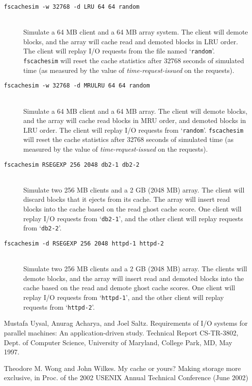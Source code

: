 \documentclass[twoside]{article}
\newcommand{\fscachesim}{\texttt{fscachesim}}
\begin{document}
\begin{description}

\item[\texttt{\fscachesim{} -w 32768 -d LRU 64 64 random}] \quad\\ Simulate a
64 MB client and a 64 MB array system. The client will demote blocks, and
the array will cache read and demoted blocks in LRU order. The client will
replay I/O requests from the file named `\texttt{random}'. \fscachesim{}
will reset the cache statistics after 32768 seconds of simulated time (as
measured by the value of \textit{time-request-issued} on the requests).

\item[\texttt{\fscachesim{} -w 32768 -d MRULRU 64 64 random}] \quad\\
Simulate a 64 MB client and a 64 MB array. The client will demote blocks,
and the array will cache read blocks in MRU order, and demoted blocks in
LRU order. The client will replay I/O requests from
`\texttt{random}'. \fscachesim{} will reset the cache statistics after
32768 seconds of simulated time (as measured by the value of
\textit{time-request-issued} on the requests).

\item[\texttt{\fscachesim{} RSEGEXP 256 2048 db2-1 db2-2}] \quad\\ Simulate
two 256 MB clients and a 2 GB (2048 MB) array. The client will discard
blocks that it ejects from its cache. The array will insert read blocks
into the cache based on the read ghost cache score. One client will replay
I/O requests from `\texttt{db2-1}', and the other client will replay
requests from `\texttt{db2-2}'.

\item[\texttt{\fscachesim{} -d RSEGEXP 256 2048 httpd-1 httpd-2}] \quad\\
Simulate two 256 MB clients and a 2 GB (2048 MB) array. The clients will
demote blocks, and the array will insert read and demoted blocks into the
cache based on the read and demote ghost cache scores. One client will
replay I/O requests from `\texttt{httpd-1}', and the other client will
replay requests from `\texttt{httpd-2}'.

\end{description}

\begin{thebibliography}{UAS97}

Mustafa Uysal, Anurag Acharya, and Joel Saltz.
\newblock Requirements of {I/O} systems for parallel machines: An
  application-driven study.
\newblock Technical Report CS-TR-3802, Dept. of Computer Science, University of
  Maryland, College Park, MD, May 1997.

Theodore M. Wong and John Wilkes.
\newblock My cache or yours? Making storage more exclusive,
\newblock in Proc. of the 2002 USENIX Annual Technical Conference (June 2002)

\end{thebibliography}
\end{document}
